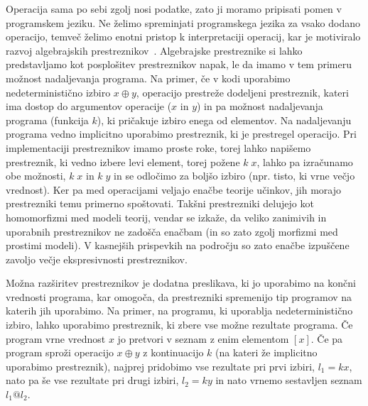 \documentclass{article}
\begin{document}
Operacija sama po sebi zgolj nosi podatke, zato ji moramo pripisati pomen v programskem jeziku. Ne želimo spreminjati programskega jezika za vsako dodano operacijo, temveč želimo enotni pristop k interpretaciji operacij, kar je motiviralo razvoj algebrajskih prestreznikov~\cite{DBLP:phd/ethos/Pretnar10}. Algebrajske prestreznike si lahko predstavljamo kot posplošitev prestreznikov napak, le da imamo v tem primeru možnost nadaljevanja programa. Na primer, če v kodi uporabimo nedeterministično izbiro $x \oplus y$, operacijo prestreže dodeljeni prestreznik, kateri ima dostop do argumentov operacije ($x$ in $y$) in pa možnost nadaljevanja programa (funkcija $k$), ki pričakuje izbiro enega od elementov. Na nadaljevanju programa vedno implicitno uporabimo prestreznik, ki je prestregel operacijo. Pri implementaciji prestreznikov imamo proste roke, torej lahko napišemo prestreznik, ki vedno izbere levi element, torej požene $k\; x$, lahko pa izračunamo obe možnosti, $k\; x$ in $k\; y$ in se odločimo za boljšo izbiro (npr. tisto, ki vrne večjo vrednost). Ker pa med operacijami veljajo enačbe teorije učinkov, jih morajo prestrezniki temu primerno spoštovati. Takšni prestrezniki delujejo kot homomorfizmi med modeli teorij, vendar se izkaže, da veliko zanimivih in uporabnih prestreznikov ne zadošča enačbam (in so zato zgolj morfizmi med prostimi modeli). V kasnejših prispevkih na področju so zato enačbe izpuščene zavoljo večje ekspresivnosti prestreznikov.

Možna razširitev prestreznikov je dodatna preslikava, ki jo uporabimo na končni vrednosti programa, kar omogoča, da prestrezniki spremenijo tip programov na katerih jih uporabimo. Na primer, na programu, ki uporablja nedeterministično izbiro, lahko uporabimo prestreznik, ki zbere vse možne rezultate programa. Če program vrne vrednost $x$ jo pretvori v seznam z enim elementom $[x]$. Če pa program sproži operacijo $x \oplus y$ z kontinuacijo $k$ (na kateri že implicitno uporabimo prestreznik), najprej pridobimo vse rezultate pri prvi izbiri, $l_1 = k x$, nato pa še vse rezultate pri drugi izbiri, $l_2 = k y$ in nato vrnemo sestavljen seznam $l_1 @ l_2$. 
\end{document}
